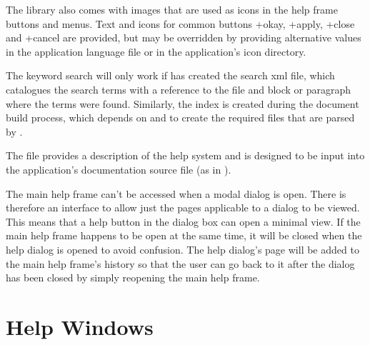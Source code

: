 \documentclass[toc=listof]{scrreport}
\begin{document}
The library also comes with images that are used as icons in the
help frame buttons and \glspl{menu}. Text and icons for common buttons 
\widget+{okay}, \widget+{apply}, \widget+{close} and
\widget+{cancel} are provided, but may be overridden by
providing alternative values in the application language file
or in the application's icon directory.

The keyword search will only work if  has created
the search \gls{xml} file, which catalogues the search terms with a
reference to the file and block or paragraph where the terms were
found. Similarly, the index is created during the document build
process, which depends on  and 
to create the required files that are parsed by .

The file  provides a description of the
help system and is designed to be input into the application's
documentation source file (as in ).

The main help frame can't be accessed when a modal dialog is open.
There is therefore an interface to allow just the pages applicable
to a dialog to be viewed. This means that a help button in the
dialog box can open a minimal view. If the main help frame happens
to be open at the same time, it will be closed when the help dialog
is opened to avoid confusion. The help dialog's page will be added
to the main help frame's history so that the user can go back to it
after the dialog has been closed by simply reopening the main help
frame.

\chapter{Help Windows}
\label{sec:helpwindows}





\printmain

\printindex
\end{document}
